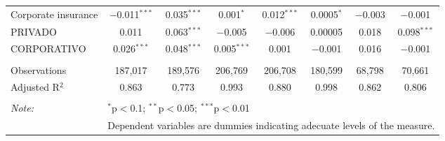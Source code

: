 \begin{table}[!htbp]
\begin{tabular}{@{\extracolsep{5pt}}lccccccc}
  Corporate insurance & $-$0.011$^{***}$ & 0.035$^{***}$ & 0.001$^{*}$ & 0.012$^{***}$ & 0.0005$^{*}$ & $-$0.003 & $-$0.001 \\ 
  PRIVADO & 0.011 & 0.063$^{***}$ & $-$0.005 & $-$0.006 & 0.00005 & 0.018 & 0.098$^{***}$ \\ 
  CORPORATIVO & 0.026$^{***}$ & 0.048$^{***}$ & 0.005$^{***}$ & 0.001 & $-$0.001 & 0.016 & $-$0.001 \\ 
 \hline \\[-1.8ex] 
Observations & 187,017 & 189,576 & 206,769 & 206,708 & 180,599 & 68,798 & 70,661 \\ 
Adjusted R$^{2}$ & 0.863 & 0.773 & 0.993 & 0.880 & 0.998 & 0.862 & 0.806 \\ 
\hline 
\hline \\[-1.8ex] 
\textit{Note:}  & \multicolumn{7}{l}{$^{*}$p$<$0.1; $^{**}$p$<$0.05; $^{***}$p$<$0.01} \\ 
 & \multicolumn{7}{l}{Dependent variables are dummies indicating adecuate levels of the measure.} \\ 
\end{tabular} 
\end{table} 
